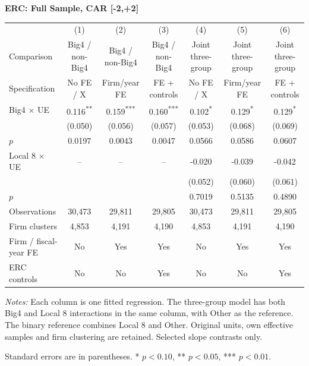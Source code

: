 \documentclass[10pt]{article}
\newcommand{\sym}[1]{\textsuperscript{#1}}
\begin{document}
\begin{minipage}{23.60cm}
\fontsize{10}{12}\selectfont
\setlength{\tabcolsep}{4pt}\renewcommand{\arraystretch}{1.08}
{\large\bfseries ERC: Full Sample, CAR [-2,+2]}\par\medskip
\begin{tabular*}{\linewidth}{@{\extracolsep{\fill}}lcccccc@{}}
\toprule
 & (1) & (2) & (3) & (4) & (5) & (6) \\
Comparison & Big4 / non-Big4 & Big4 / non-Big4 & Big4 / non-Big4 & Joint three-group & Joint three-group & Joint three-group \\
Specification & No FE / X & Firm/year FE & FE + controls & No FE / X & Firm/year FE & FE + controls \\
\midrule
Big4 $\times$ UE & 0.116\sym{**} & 0.159\sym{***} & 0.160\sym{***} & 0.102\sym{*} & 0.129\sym{*} & 0.129\sym{*} \\
 & (0.050) & (0.056) & (0.057) & (0.053) & (0.068) & (0.069) \\
$p$ & 0.0197 & 0.0043 & 0.0047 & 0.0566 & 0.0586 & 0.0607 \\
Local 8 $\times$ UE & -- & -- & -- & -0.020 & -0.039 & -0.042 \\
 &  &  &  & (0.052) & (0.060) & (0.061) \\
$p$ &  &  &  & 0.7019 & 0.5135 & 0.4890 \\
\midrule
Observations & 30,473 & 29,811 & 29,805 & 30,473 & 29,811 & 29,805 \\
Firm clusters & 4,853 & 4,191 & 4,190 & 4,853 & 4,191 & 4,190 \\
Firm / fiscal-year FE & No & Yes & Yes & No & Yes & Yes \\
ERC controls & No & No & Yes & No & No & Yes \\
\bottomrule\end{tabular*}\par\medskip
\fontsize{9}{11}\selectfont\textit{Notes:} Each column is one fitted regression. The three-group model has both Big4 and Local 8 interactions in the same column, with Other as the reference. The binary reference combines Local 8 and Other. Original units, own effective samples and firm clustering are retained. Selected slope contrasts only.
\par Standard errors are in parentheses. * $p<0.10$, ** $p<0.05$, *** $p<0.01$.
\end{minipage}
\end{document}
